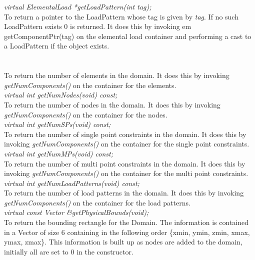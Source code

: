 {\em virtual  ElementalLoad *getLoadPattern(int tag);}\\
To return a pointer to the LoadPattern whose tag is given by {\em tag}. If
no such LoadPattern exists $0$ is returned. It does this by invoking {em
getComponentPtr(tag)} on the elemental load container and
performing a cast to a LoadPattern if the object exists. \\


 \\
\\
To return the number of elements in the domain. It does this by
invoking {\em getNumComponents()} on the container for the elements. \\

{\em virtual int getNumNodes(void) const;}\\
To return the number of nodes in the domain. It does this by
invoking {\em getNumComponents()} on the container for the
nodes. \\

{\em virtual int getNumSPs(void) const;}\\
To return the number of single point constraints in the domain. It
does this by invoking {\em getNumComponents()} on the container for
the single point constraints. \\

{\em virtual int getNumMPs(void) const;}\\
To return the number of multi point constraints in the domain. It
does this by invoking {\em getNumComponents()} on the container for
the multi point constraints. \\

{\em virtual int getNumLoadPatterns(void) const;}\\
To return the number of load patterns in the domain. It
does this by invoking {\em getNumComponents()} on the container for
the load patterns. \\

{\em virtual const Vector \&getPhysicalBounds(void);} \\
To return the bounding rectangle for the Domain. The information is
contained in a Vector of size 6 containing in the following order
\{xmin, ymin, zmin, xmax, ymax, zmax\}. This information is built up
as nodes are added to the domain, initially all are set to $0$ in the
constructor. \\

